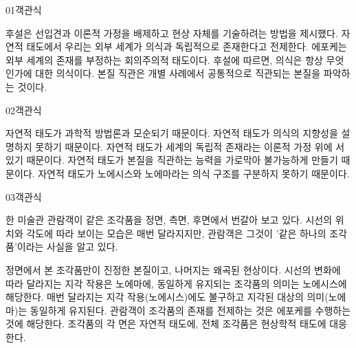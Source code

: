 \documentclass[fs85,seriesWit]{korfarm-base}
\begin{document}

\kfBeginMC
\begin{kfQBlock}{01}{객관식}
\begin{kfChoices}
\kfChoice 후설은 선입견과 이론적 가정을 배제하고 현상 자체를 기술하려는 방법을 제시했다.
\kfChoice 자연적 태도에서 우리는 외부 세계가 의식과 독립적으로 존재한다고 전제한다.
\kfChoice 에포케는 외부 세계의 존재를 부정하는 회의주의적 태도이다.
\kfChoice 후설에 따르면, 의식은 항상 무엇인가에 대한 의식이다.
\kfChoice 본질 직관은 개별 사례에서 공통적으로 직관되는 본질을 파악하는 것이다.
\end{kfChoices}
\end{kfQBlock}

\begin{kfQBlock}{02}{객관식}
\begin{kfChoices}
\kfChoice 자연적 태도가 과학적 방법론과 모순되기 때문이다.
\kfChoice 자연적 태도가 의식의 지향성을 설명하지 못하기 때문이다.
\kfChoice 자연적 태도가 세계의 독립적 존재라는 이론적 가정 위에 서 있기 때문이다.
\kfChoice 자연적 태도가 본질을 직관하는 능력을 가로막아 불가능하게 만들기 때문이다.
\kfChoice 자연적 태도가 노에시스와 노에마라는 의식 구조를 구분하지 못하기 때문이다.
\end{kfChoices}
\end{kfQBlock}

\begin{kfQBlock}{03}{객관식}
\begin{kfEvidence}한 미술관 관람객이 같은 조각품을 정면, 측면, 후면에서 번갈아 보고 있다. 시선의 위치와 각도에 따라 보이는 모습은 매번 달라지지만, 관람객은 그것이 '같은 하나의 조각품'이라는 사실을 알고 있다.\end{kfEvidence}
\begin{kfChoices}
\kfChoice 정면에서 본 조각품만이 진정한 본질이고, 나머지는 왜곡된 현상이다.
\kfChoice 시선의 변화에 따라 달라지는 지각 작용은 노에마에, 동일하게 유지되는 조각품의 의미는 노에시스에 해당한다.
\kfChoice 매번 달라지는 지각 작용(노에시스)에도 불구하고 지각된 대상의 의미(노에마)는 동일하게 유지된다.
\kfChoice 관람객이 조각품의 존재를 전제하는 것은 에포케를 수행하는 것에 해당한다.
\kfChoice 조각품의 각 면은 자연적 태도에, 전체 조각품은 현상학적 태도에 대응한다.
\end{kfChoices}
\end{kfQBlock}
\end{document}
